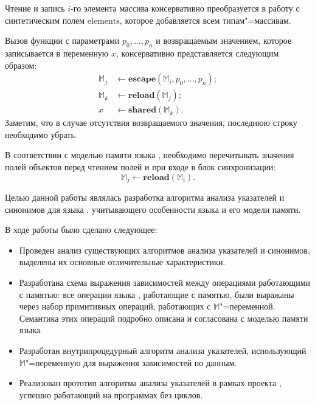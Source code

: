 \documentclass[14pt,titlepage,draft]{extarticle}
\newcommand{\java}{\eng{Java}\xspace}
\newcommand{\M}{\ensuremath{\mathbb{M}}}
\newcommand{\field}[1]{\mathrm{#1}}
\newcommand{\op}[1]{\mathbf{#1}}
\begin{document}
      Чтение и запись $i$-го элемента массива консервативно преобразуется в
      работу с синтетическим полем $\field{elements}$, которое добавляется всем
      типам"=массивам.

      Вызов функции с параметрами $p_0, \ldots, p_n$ и возвращаемым значением,
      которое записывается в переменную $x$, консервативно представляется
      следующим образом:
      \[\begin{aligned}
        \M_j &\gets \op{escape}(\M_i, p_0, \ldots, p_n); \\
        \M_k &\gets \op{reload}(\M_j); \\
        x    &\gets \op{shared}(\M_k).
      \end{aligned}\]
      Заметим, что в случае отсутствия возвращаемого значения, последнюю строку
      необходимо убрать.

      В соответствии с моделью памяти языка \java, необходимо перечитывать
      значения полей объектов перед чтением  полей и при входе в
      блок синхронизации:
      \[ \M_j \gets \op{reload}(\M_i). \]



    Целью данной работы являлась разработка алгоритма анализа указателей и
    синонимов для языка \java, учитывающего особенности языка и его модели
    памяти.

    В ходе работы было сделано следующее:
    \begin{itemize}
      \item Проведен анализ существующих алгоритмов анализа указателей и
            синонимов, выделены их основные отличительные характеристики.
      \item Разработана схема выражения зависимостей между операциями
            работающими с памятью: все операции языка \java, работающие с
            памятью, были выражаны через набор примитивных операций, работающих
            с \M"=переменной.  Семантика этих операций подробно описана и
            согласована с моделью памяти языка.
      \item Разработан внутрипроцедурный алгоритм анализа указателей,
            использующий \M"=переменную для выражения зависимостей по данным.
      \item Реализован прототип алгоритма анализа указателей в рамках проекта
            , успешно работающий на программах без циклов.
    \end{itemize}
\end{document}

